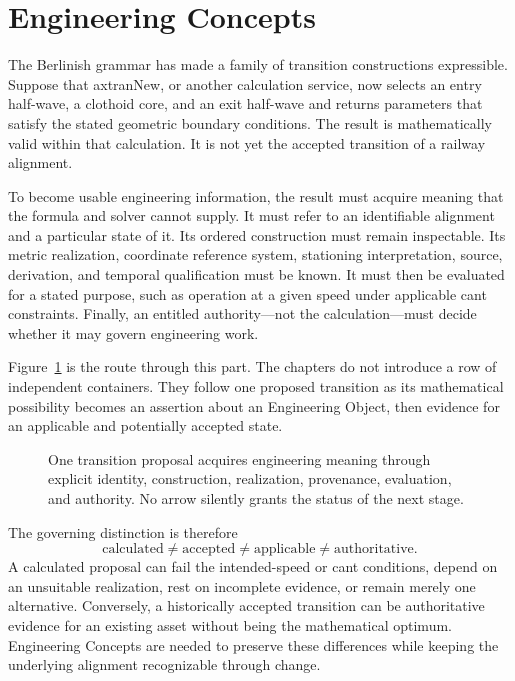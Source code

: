 
\chapter*{Engineering Concepts}
{}

The Berlinish grammar has made a family of transition constructions
expressible. Suppose that axtranNew, or another calculation service, now
selects an entry half-wave, a clothoid core, and an exit half-wave and returns
parameters that satisfy the stated geometric boundary conditions. The result
is mathematically valid within that calculation. It is not yet the accepted
transition of a railway alignment.

To become usable engineering information, the result must acquire meaning
that the formula and solver cannot supply. It must refer to an identifiable
alignment and a particular state of it. Its ordered construction must remain
inspectable. Its metric realization, coordinate reference system, stationing
interpretation, source, derivation, and temporal qualification must be known.
It must then be evaluated for a stated purpose, such as operation at a given
speed under applicable cant constraints. Finally, an entitled authority---not
the calculation---must decide whether it may govern engineering work.

Figure~\ref{fig:transition-meaning-chain} is the route through this part. The
chapters do not introduce a row of independent containers. They follow one
proposed transition as its mathematical possibility becomes an assertion
about an Engineering Object, then evidence for an applicable and potentially
accepted state.

\begin{figure}[htbp]
  \centering
  \resizebox{\textwidth}{!}{}
  \caption{One transition proposal acquires engineering meaning through
  explicit identity, construction, realization, provenance, evaluation, and
  authority. No arrow silently grants the status of the next stage.}
  \label{fig:transition-meaning-chain}
\end{figure}

The governing distinction is therefore
\begin{equation}
\text{calculated}\neq\text{accepted}\neq\text{applicable}
\neq\text{authoritative}.
\label{eq:calculation-status-chain}
\end{equation}
A calculated proposal can fail the intended-speed or cant conditions, depend
on an unsuitable realization, rest on incomplete evidence, or remain merely
one alternative. Conversely, a historically accepted transition can be
authoritative evidence for an existing asset without being the mathematical
optimum. Engineering Concepts are needed to preserve these differences while
keeping the underlying alignment recognizable through change.
